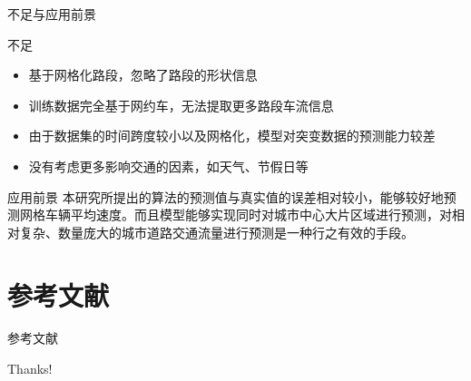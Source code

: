 \documentclass[10pt]{beamer}
\begin{document}
\begin{frame}{不足与应用前景}
    
    \begin{block}{不足}
          \begin{itemize}
            \item 基于网格化路段，忽略了\alert{路段的形状信息}
            \item 训练数据\alert{完全基于网约车}，无法提取更多路段车流信息
            \item 由于数据集的时间跨度较小以及网格化，模型\alert{对突变数据的预测能力较差}
            \item 没有考虑\alert{更多影响交通的因素}，如天气、节假日等
        \end{itemize}
    \end{block}
    
    \begin{block}{应用前景}
        本研究所提出的算法的预测值与真实值的误差相对较小，能够较好地预测网格车辆平均速度。而且模型能够实现\alert{同时对城市中心大片区域进行预测}，对\alert{相对复杂、数量庞大}的城市道路交通流量进行预测是一种行之有效的手段。      
    \end{block}

\end{frame}

\section{参考文献}

\begin{frame}[allowframebreaks]{参考文献}
    \printbibliography
\end{frame}

\begin{frame}
    \begin{center}
        {\Huge\calligra Thanks!}
    \end{center}
\end{frame}
\end{document}
